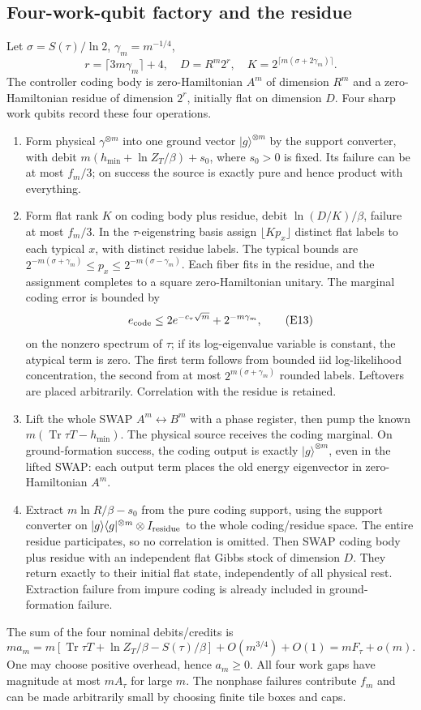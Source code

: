 \documentclass[11pt]{article}
\theoremstyle{definition}
\theoremstyle{remark}
\newcommand{\Tr}{\operatorname{Tr}}
\begin{document}
\subsection*{Four-work-qubit factory and the residue}
Let \(\sigma=S(\tau)/\ln2\), \(\gamma_m=m^{-1/4}\),
\[
 r=\lceil3m\gamma_m\rceil+4,\quad
 D=R^m2^r,\quad K=2^{\lceil m(\sigma+2\gamma_m)\rceil}.
\]
The controller coding body is zero-Hamiltonian \(A^m\) of dimension \(R^m\)
and a zero-Hamiltonian residue of dimension \(2^r\), initially flat on dimension
\(D\). Four sharp work qubits record these four operations.
\begin{enumerate}
\item Form physical \(\gamma^{\otimes m}\) into one ground vector
\(|g\rangle^{\otimes m}\) by the support converter, with debit
\(m(h_{\min}+\ln Z_T/\beta)+s_0\), where \(s_0>0\) is fixed.
Its failure can be at most \(f_m/3\); on success the source is exactly
pure and hence product with everything.
\item Form flat rank \(K\) on coding body plus residue, debit
\(\ln(D/K)/\beta\), failure at most \(f_m/3\).
In the \(\tau\)-eigenstring basis assign \(\lfloor Kp_x\rfloor\)
distinct flat labels to each typical \(x\), with distinct residue labels.
The typical bounds are
\(2^{-m(\sigma+\gamma_m)}\le p_x\le2^{-m(\sigma-\gamma_m)}\).
Each fiber fits in the residue, and the assignment completes to a
square zero-Hamiltonian unitary. The marginal coding error is bounded by
\[
 e_{\rm code}\le2e^{-c_\tau\sqrt m}+2^{-m\gamma_m},    \tag{E13}
\]
on the nonzero spectrum of \(\tau\); if its log-eigenvalue variable
is constant, the atypical term is zero. The first term follows from
bounded iid log-likelihood concentration, the second from at most
\(2^{m(\sigma+\gamma_m)}\) rounded labels. Leftovers are placed
arbitrarily. Correlation with the residue is retained.
\item Lift the whole SWAP \(A^m\leftrightarrow B^m\) with a phase
register, then pump the known
\(m(\Tr\tau T-h_{\min})\). The physical source receives the coding
marginal. On ground-formation success, the coding output is exactly
\(|g\rangle^{\otimes m}\), even in the lifted SWAP: each output term
places the old energy eigenvector in zero-Hamiltonian \(A^m\).
\item Extract \(m\ln R/\beta-s_0\) from the pure coding support,
using the support converter on
\(|g\rangle\langle g|^{\otimes m}\otimes I_{\rm residue}\)
to the whole coding/residue space. The entire residue participates,
so no correlation is omitted. Then SWAP coding body plus residue
with an independent flat Gibbs stock of dimension \(D\).
They return exactly to their initial flat state, independently of
all physical rest. Extraction failure from impure coding is already
included in ground-formation failure.
\end{enumerate}
The sum of the four nominal debits/credits is
\[
 ma_m=m[\Tr\tau T+\ln Z_T/\beta-S(\tau)/\beta]
       +O(m^{3/4})+O(1)=mF_\tau+o(m).               \tag{E14}
\]
One may choose positive overhead, hence \(a_m\ge0\).
All four work gaps have magnitude at most \(mA_\tau\) for large \(m\).
The nonphase failures contribute \(f_m\) and can be made arbitrarily
small by choosing finite tile boxes and caps.
\end{document}
